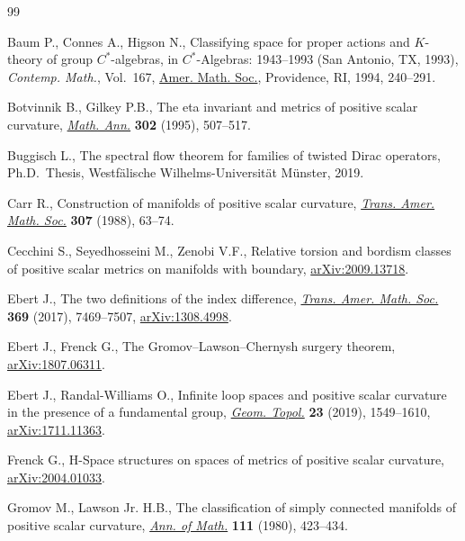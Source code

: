 \begin{thebibliography}{99}
\footnotesize\itemsep=0pt

Baum P., Connes A., Higson N., Classifying space for proper actions and
 {$K$}-theory of group {$C^\ast$}-algebras, in {$C^\ast$}-Algebras: 1943--1993
 ({S}an {A}ntonio, {TX}, 1993), \textit{Contemp. Math.}, Vol.~167, \href{https://doi.org/10.1090/conm/167/1292018}{Amer. Math.
 Soc.}, Providence, RI, 1994, 240--291.

Botvinnik B., Gilkey P.B., The eta invariant and metrics of positive scalar
 curvature, \href{https://doi.org/10.1007/BF01444505}{\textit{Math. Ann.}} \textbf{302} (1995), 507--517.

Buggisch L., The spectral flow theorem for families of twisted {D}irac
 operators, Ph.D.~Thesis, {W}estf\"alische Wilhelms-Universit\"at M\"unster,
 2019.

Carr R., Construction of manifolds of positive scalar curvature, \href{https://doi.org/10.2307/2000751}{\textit{Trans.
 Amer. Math. Soc.}} \textbf{307} (1988), 63--74.

Cecchini S., Seyedhosseini M., Zenobi V.F., Relative torsion and bordism
 classes of positive scalar metrics on manifolds with boundary,
 \href{https://arxiv.org/abs/2009.13718}{arXiv:2009.13718}.

Ebert J., The two definitions of the index difference, \href{https://doi.org/10.1090/tran/7133}{\textit{Trans. Amer.
 Math. Soc.}} \textbf{369} (2017), 7469--7507, \href{https://arxiv.org/abs/1308.4998}{arXiv:1308.4998}.

Ebert J., Frenck G., The Gromov--Lawson--Chernysh surgery theorem,
 \href{https://arxiv.org/abs/1807.06311}{arXiv:1807.06311}.

Ebert J., Randal-Williams O., Infinite loop spaces and positive scalar
 curvature in the presence of a fundamental group, \href{https://doi.org/10.2140/gt.2019.23.1549}{\textit{Geom. Topol.}}
 \textbf{23} (2019), 1549--1610, \href{https://arxiv.org/abs/1711.11363}{arXiv:1711.11363}.

Frenck G., H-Space structures on spaces of metrics of positive scalar
 curvature, \href{https://arxiv.org/abs/2004.01033}{arXiv:2004.01033}.

Gromov M., Lawson Jr. H.B., The classification of simply connected manifolds of
 positive scalar curvature, \href{https://doi.org/10.2307/1971103}{\textit{Ann. of Math.}} \textbf{111} (1980),
 423--434.


\end{thebibliography}
